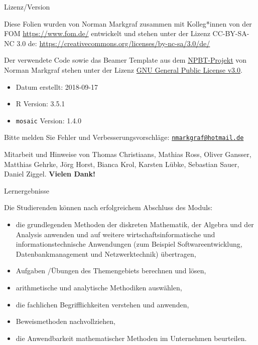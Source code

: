 \documentclass[12pt,ngerman,a4paper,ignorenonframetext,]{beamer}
\providecommand{\tightlist}{%
  \setlength{\itemsep}{0pt}\setlength{\parskip}{0pt}}
\begin{document}
\begin{frame}[fragile]{Lizenz\thinspace{}/\thinspace{}Version}
\protect\hypertarget{lizenz-version}{}

Diese Folien wurden von Norman Markgraf zusammen mit Kolleg*innen von
der FOM \url{https://www.fom.de/} entwickelt und stehen unter der Lizenz
CC-BY-SA-NC 3.0 de:
\url{https://creativecommons.org/licenses/by-nc-sa/3.0/de/}

Der verwendete Code sowie das Beamer Template aus dem
\href{http://github.com/NMarkgraf/NPBT}{NPBT-Projekt} von Norman
Markgraf stehen unter der Lizenz
\href{https://www.gnu.org/licenses/gpl-3.0.de.html}{GNU General Public
License v3.0}.

\begin{itemize}
\tightlist
\item
  Datum erstellt: 2018-09-17
\item
  R Version: 3.5.1
\item
  \texttt{mosaic} Version: 1.4.0
\end{itemize}

Bitte melden Sie Fehler und Verbesserungsvorschläge:
\href{mailto:nmarkgraf@hotmail.de}{\nolinkurl{nmarkgraf@hotmail.de}}

Mitarbeit und Hinweise von Thomas Christiaans, Mathias Ross, Oliver
Gansser, Matthias Gehrke, Jörg Horst, Bianca Krol, Karsten Lübke,
Sebastian Sauer, Daniel Ziggel. \textbf{Vielen Dank!}

\end{frame}

\begin{frame}{Lernergebnisse}
\protect\hypertarget{lernergebnisse}{}

Die Studierenden können nach erfolgreichem Abschluss des Moduls:

\begin{itemize}
\tightlist
\item
  die grundlegenden Methoden der diskreten Mathematik, der Algebra und
  der Analysis anwenden und auf weitere wirtschaftsinformatische und
  informationstechnische Anwendungen (zum Beispiel Softwareentwicklung,
  Datenbankmanagement und Netzwerktechnik) übertragen,
\item
  Aufgaben /\thinspace{}Übungen des Themengebiets berechnen und lösen,
\item
  arithmetische und analytische Methodiken auswählen,
\item
  die fachlichen Begrifflichkeiten verstehen und anwenden,
\item
  Beweismethoden nachvollziehen,
\item
  die Anwendbarkeit mathematischer Methoden im Unternehmen beurteilen.
\end{itemize}

\end{frame}
\end{document}
